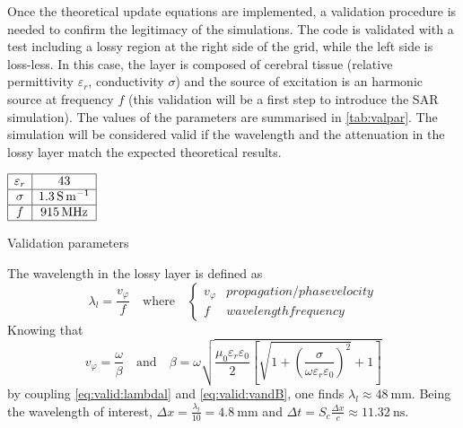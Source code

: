 Once the theoretical update equations are implemented, a validation procedure is needed to confirm the legitimacy of the simulations. The code is validated with a test including a lossy region at the right side of the grid, while the left side is loss-less. In this case, the layer is composed of cerebral tissue (relative permittivity $\varepsilon_r$, conductivity $\sigma$) and the source of excitation is an harmonic source at frequency $f$ (this validation will be a first step to introduce the SAR simulation). The values of the parameters are summarised in \autoref{tab:valpar}. The simulation will be considered valid if the wavelength and the attenuation in the lossy layer match the expected theoretical results.


\begin{table}[H]
    \centering
    $\begin{array}{|c|c|}
    \hline
    \varepsilon_r & 43 \\\hline
    \sigma & \SI{1.3}{\siemens\per\meter}\\\hline
    f & \SI{915}{\mega\hertz}\\\hline
    \end{array}$
    \caption{Validation parameters}
    \label{tab:valpar}
\end{table}

The wavelength in the lossy layer is defined as
\begin{equation}
\label{eq:valid:lambdal}
    \lambda_l = \frac{v_\varphi}{f}\quad\text{where}\quad\begin{cases*}
    v_\varphi & propagation/phase velocity \\
    f & wavelength frequency
    \end{cases*}
\end{equation}
Knowing that 
\begin{equation}\label{eq:valid:vandB}
v_\varphi=\frac{\omega}{\beta}\quad\text{and}\quad \beta=\omega\sqrt{\frac{\mu_0\varepsilon_r\varepsilon_0}{2}\left[\sqrt{1+\left(\frac{\sigma}{\omega\varepsilon_r\varepsilon_0}\right)^2}+1\right]}
\end{equation}
by coupling \eqref{eq:valid:lambdal} and \eqref{eq:valid:vandB}, one finds $\lambda_l\approx\SI{48}{\milli\meter}$. Being the wavelength of interest, $\Delta x=\frac{\lambda_l}{10}=\SI{4.8}{\milli\meter}$ and $\Delta t=S_c\frac{\Delta x}{c}\approx\SI{11.32}{\nano\second}$.  

